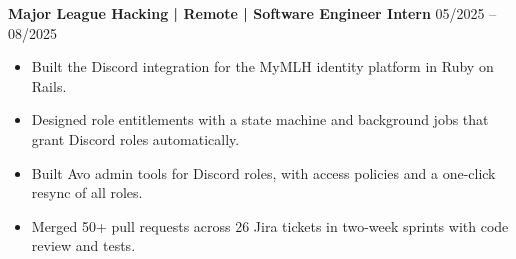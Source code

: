 \noindent
\textbf{Major League Hacking | Remote | Software Engineer Intern} \hfill 05/2025 -- 08/2025
\begin{itemize}
    \item Built the Discord integration for the MyMLH identity platform in Ruby on Rails.
    \item Designed role entitlements with a state machine and background jobs that grant Discord roles automatically.
    \item Built Avo admin tools for Discord roles, with access policies and a one-click resync of all roles.
    \item Merged 50+ pull requests across 26 Jira tickets in two-week sprints with code review and tests.
\end{itemize}
